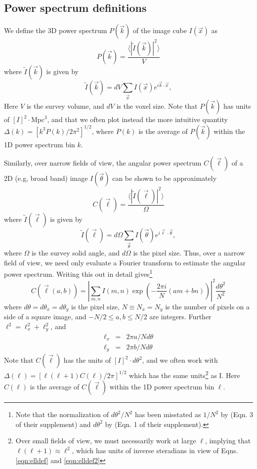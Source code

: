 \documentclass[numberedappendix]{emulateapj}
\begin{document}
\subsection{Power spectrum definitions}
\label{sec:pspecdefs}

We define the 3D power spectrum $P(\vec{k})$ of the image cube $I(\vec{x})$ as 
\begin{equation}
\label{eqn:pspec3Ddef}
	P(\vec{k}) = \frac{\langle|\tilde{I}(\vec{k})|^2\rangle}{V}
\end{equation}
where $\tilde{I}(\vec{k})$ is given by
\begin{equation}
	\tilde{I}(\vec{k})=dV\sum_{\vec{x}}I(\vec{x})e^{i\vec{k}\cdot\vec{x}},
\end{equation}
Here $V$ is the survey volume, and $dV$ is the voxel size. Note that $P(\vec{k})$ has units of $[I]^2\cdot\text{Mpc}^3$, and that we often plot instead the more intuitive quantity $\Delta(k)=[k^3 P(k)/2\pi^2]^{1/2}$, where $P(k)$ is the average of $P(\vec{k})$ within the 1D power spectrum bin $k$.

Similarly, over narrow fields of view, the angular power spectrum $C(\vec{\ell})$ of a 2D (e.g, broad band) image $I(\vec{\theta})$ can be shown to be approximately
\begin{equation}
\label{eqn:Cldef0}
	C(\vec{\ell}) = \frac{\langle|\tilde{I}(\vec{\ell})|^2\rangle}{\Omega} 
\end{equation}
where $\tilde{I}(\vec{\ell})$ is given by
\begin{equation}
	\tilde{I}(\vec{\ell})=d\Omega\sum_{\vec{\theta}}I(\vec{\theta})e^{i\vec{\ell}\cdot\vec{\theta}},
\end{equation}
where $\Omega$ is the survey solid angle, and $d\Omega$ is the pixel size. Thus, over a narrow field of view, we need only evaluate a Fourier transform to estimate the angular power spectrum. Writing this out in detail gives\footnote{Note that the normalization of $d\theta^2/N^2$ has been misstated as $1/N^2$ by \citet{zemcov14} (Eqn. 3 of their supplement) and $d\theta^2$ by \citet{cooray12} (Eqn. 1 of their supplement).} 
\begin{equation}
\label{eqn:Cldef}
	C(\vec\ell(a,b))=\left|\sum_{m,n}I(m,n)\exp\left(-\frac{2\pi i}{N}  (am+bn)\right)\right|^2\frac{d\theta^2}{N^2}
\end{equation}
where $d\theta=d\theta_x=d\theta_y$ is the pixel size, $N\equiv N_x=N_y$ is the number of pixels on a side of a square image, and $-N/2 \leq a,b\leq N/2$ are integers. Further $\ell^2=\ell_x^2+\ell_y^2$, and 
\begin{eqnarray}
\ell_x&=&2\pi a/N d\theta \label{eqn:elldef}\\
\ell_y&=&2\pi b/Nd\theta \label{eqn:elldef2}
\end{eqnarray}
Note that $C(\vec{\ell})$ has the units of $[I]^2\cdot d\theta^2$, and we often work with $\Delta(\ell)=[\ell(\ell+1)C(\ell)/2\pi]^{1/2}$ which has the same units\footnote{Over small fields of view, we must necessarily work at large $\ell$, implying that $\ell(\ell+1)\approx\ell^2$, which has units of inverse steradians in view of Eqns. \ref{eqn:elldef} and \ref{eqn:elldef2}} as I. Here $C(\ell)$ is the average of $C(\vec\ell)$ within the 1D power spectrum bin $\ell$.
\end{document}
